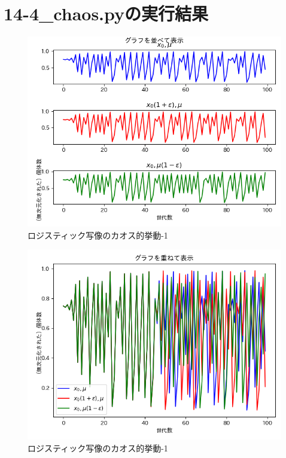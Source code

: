 \documentclass[a4paper, oneside]{jsarticle}
\begin{document}
\section{14-4\_chaos.pyの実行結果}

\begin{figure}[H]
  \centering
  \includegraphics[width=150mm]{chaos-parallel.png}
    \caption{ロジスティック写像のカオス的挙動-1}
    \label{fig:chaos-parallel}
\end{figure}
\begin{figure}[H]
  \centering
  \includegraphics[width=150mm]{chaos-overlap.png}
    \caption{ロジスティック写像のカオス的挙動-1}
    \label{fig:chaos-overlap}
\end{figure}
\end{document}
